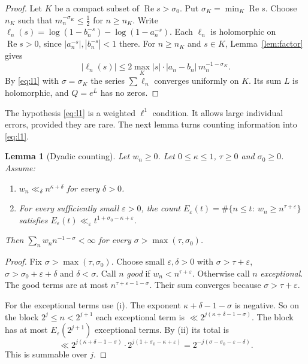 \documentclass[12pt,letterpaper]{article}
\newtheorem{lemma}[theorem]{Lemma}
\theoremstyle{definition}
\theoremstyle{remark}
\numberwithin{equation}{section}
\newcommand{\Ree}{\operatorname{Re}}
\newcommand{\eps}{\varepsilon}
\begin{document}
\begin{proof}
Let $K$ be a compact subset of $\Ree s>\sigma_0$. Put
$\sigma_K=\min_K\Ree s$. Choose $n_K$ such that $m_n^{-\sigma_K}\le\frac12$
for $n\ge n_K$. Write
$\ell_n(s)=\log(1-b_n^{-s})-\log(1-a_n^{-s})$. Each $\ell_n$ is
holomorphic on $\Ree s>0$, since $|a_n^{-s}|,|b_n^{-s}|<1$ there. For
$n\ge n_K$ and $s\in K$, Lemma~\ref{lem:factor} gives
\[
|\ell_n(s)|\le 2\max_K|s|\cdot|a_n-b_n|\,m_n^{-1-\sigma_K}.
\]
By \eqref{eq:l1} with $\sigma=\sigma_K$ the series $\sum\ell_n$ converges
uniformly on $K$. Its sum $L$ is holomorphic, and $Q=e^L$ has no zeros.
\end{proof}

The hypothesis \eqref{eq:l1} is a weighted $\ell^1$ condition. It allows
large individual errors, provided they are rare. The next lemma turns
counting information into \eqref{eq:l1}.

\begin{lemma}[Dyadic counting]\label{lem:dyadic}
Let $w_n\ge0$. Let $0\le\kappa\le1$, $\tau\ge0$ and $\sigma_0\ge0$.
Assume:
\begin{enumerate}[label=(\roman*)]
\item $w_n\ll_\delta n^{\kappa+\delta}$ for every $\delta>0$.
\item For every sufficiently small $\eps>0$, the count
  $E_\eps(t)=\#\{n\le t:\ w_n\ge n^{\tau+\eps}\}$ satisfies
  $E_\eps(t)\ll_\eps t^{1+\sigma_0-\kappa+\eps}$.
\end{enumerate}
Then $\sum_n w_n n^{-1-\sigma}<\infty$ for every
$\sigma>\max(\tau,\sigma_0)$.
\end{lemma}

\begin{proof}
Fix $\sigma>\max(\tau,\sigma_0)$. Choose small $\eps,\delta>0$ with
$\sigma>\tau+\eps$, $\sigma>\sigma_0+\eps+\delta$ and $\delta<\sigma$.
Call $n$ \emph{good} if $w_n<n^{\tau+\eps}$. Otherwise call $n$
\emph{exceptional}. The good terms are at most $n^{\tau+\eps-1-\sigma}$.
Their sum converges because $\sigma>\tau+\eps$.

For the exceptional terms use (i). The exponent $\kappa+\delta-1-\sigma$
is negative. So on the block $2^j\le n<2^{j+1}$ each exceptional term is
$\ll 2^{j(\kappa+\delta-1-\sigma)}$. The block has at most
$E_\eps(2^{j+1})$ exceptional terms. By (ii) its total is
\[
\ll 2^{j(\kappa+\delta-1-\sigma)}\cdot2^{j(1+\sigma_0-\kappa+\eps)}
=2^{-j(\sigma-\sigma_0-\eps-\delta)}.
\]
This is summable over $j$.
\end{proof}
\end{document}
